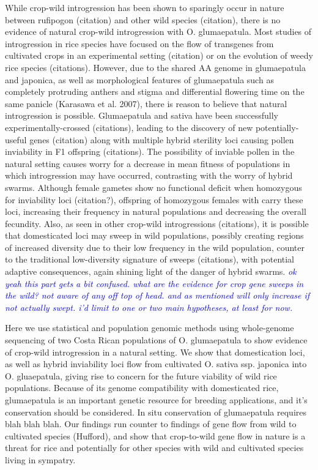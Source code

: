 \documentclass[11pt]{article} %
\newcommand{\jri}[1]{\textcolor{blue}{ \emph{\scriptsize  #1}} } %
\begin{document}
\begin{linenumbers}
While crop-wild introgression has been shown to sparingly occur in nature between rufipogon (citation) and other wild species (citation), there is no evidence of natural crop-wild introgression with O. glumaepatula.  Most studies of introgression in rice species have focused on the flow of transgenes from cultivated crops in an experimental setting (citation) or on the evolution of weedy rice species (citations).  However, due to the shared AA genome in glumaepatula and japonica, as well as morphological features of glumaepatula such as completely protruding anthers and stigma and differential flowering time on the same panicle (Karasawa et al. 2007), there is reason to believe that natural introgression is possible.  Glumaepatula and sativa have been successfully experimentally-crossed (citations), leading to the discovery of new potentially-useful genes (citation) along with multiple hybrid sterility loci causing pollen inviability in F1 offspring (citations).  The possibility of inviable pollen in the natural setting causes worry for a decrease in mean fitness of populations in which introgression may have occurred, contrasting with the worry of hybrid swarms.  Although female gametes show no functional deficit when homozygous for inviability loci (citation?), offspring of homozygous females with carry these loci, increasing their frequency in natural populations and decreasing the overall fecundity.  Also, as seen in other crop-wild introgressions (citations), it is possible that domesticated loci may sweep in wild populations, possibly creating regions of increased diversity due to their low frequency in the wild population, counter to the traditional low-diversity signature of sweeps (citations), with potential adaptive consequences, again shining light of the danger of hybrid swarms. \jri{ok yeah this part gets a bit confused. what are the evidence for crop gene sweeps in the wild? not aware of any off top of head. and as mentioned will only increase if not actually swept. i'd limit to one or two main hypotheses, at least for now.}

Here we use statistical and population genomic methods using whole-genome sequencing of two Costa Rican populations of O. glumaepatula to show evidence of crop-wild introgression in a natural setting.  We show that domestication loci, as well as hybrid inviability loci flow from cultivated O. sativa ssp. japonica into O. gluaepatula, giving rise to concern for the future viability of wild rice populations.  Because of its genome compatibility with domesticated rice, glumaepatula is an important genetic resource for breeding applications, and it’s conservation should be considered.  In situ conservation of glumaepatula requires blah blah blah.  Our findings run counter to findings of gene flow from wild to cultivated species (Hufford), and show that crop-to-wild gene flow in nature is a threat for rice and potentially for other species with wild and cultivated species living in sympatry.


\end{linenumbers}
\end{document}

